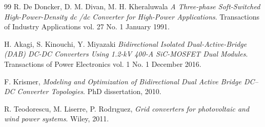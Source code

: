 \documentclass[12pt,a4paper]{scrartcl}
\begin{document}
\begin{onehalfspace}
\begin{thebibliography}{99}
	R. De Doncker, D. M. Divan, M. H. Kheraluwala \emph{A Three-phase Soft-Switched High-Power-Density dc /dc Converter for High-Power Applications}. Transactions of Industry Applications vol. 27 No. 1 January 1991.

	H. Akagi, S. Kinouchi, Y. Miyazaki \emph{Bidirectional Isolated Dual-Active-Bridge (DAB) DC-DC Converters Using 1.2-kV 400-A SiC-MOSFET Dual Modules}. Transactions of Power Electronics vol. 1 No. 1 December 2016.

	F. Krismer, \emph{Modeling and Optimization of Bidirectional Dual Active Bridge DC–DC Converter Topologies}. PhD dissertation, 2010.

	R. Teodorescu, M. Liserre, P. Rodrıguez, \emph{Grid converters for photovoltaic and wind power systems}. Wiley, 2011.
\end{thebibliography}

\end{onehalfspace}
\end{document}
